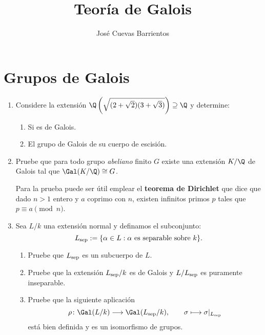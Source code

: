 \documentclass[11pt, reqno]{amsart}
\title{Teoría de Galois}
\date{\DTMdate{2025-08-20}}
\author{José Cuevas Barrientos}
\begin{document}
\maketitle

\section{Grupos de Galois}
\begin{enumerate}

	\item Considere la extensión $\Q\left( \sqrt{(2+\sqrt 2)(3+\sqrt 3)} \right) \supseteq \Q$ y determine:
		\begin{multicols}{2}
			\begin{enumerate}
				\item Si es de Galois.
				\item El grupo de Galois de su cuerpo de escisión.
			\end{enumerate}
		\end{multicols}

	\item\label{exr:inverse_gal_ab}\lookst
		Pruebe que para todo grupo \emph{abeliano} finito $G$ existe una extensión $K/\Q$ de Galois tal que
		$\Gal(K/\Q) \cong G$.

		\begin{hint}
			Para la prueba puede ser útil emplear el \textbf{teorema de Dirichlet} que dice que
			dado $n > 1$ entero y $a$ coprimo con $n$, existen infinitos primos $p$ tales que $p \equiv a
			\pmod n$.
		\end{hint}

	\item Sea $L/k$ una extensión normal y definamos el subconjunto:
		\[
			L_{\rm sep} := \{ \alpha \in L : \alpha \text{ es separable sobre } k \}.
		\]
		\begin{enumerate}
			\item Pruebe que $L_{\rm sep}$ es un subcuerpo de $L$.
			\item Pruebe que la extensión $L_{\rm sep}/k$ es de Galois y $L/L_{\rm sep}$ es puramente inseparable.
			\item Pruebe que la siguiente aplicación
				\[
					\rho \colon \Gal(L/k) \longrightarrow \Gal(L_{\rm sep}/k), \qquad \sigma \longmapsto \sigma|_{L_{\rm sep}}
				\]
				está bien definida y es un isomorfismo de grupos.
		\end{enumerate}


\end{enumerate}
\end{document}
